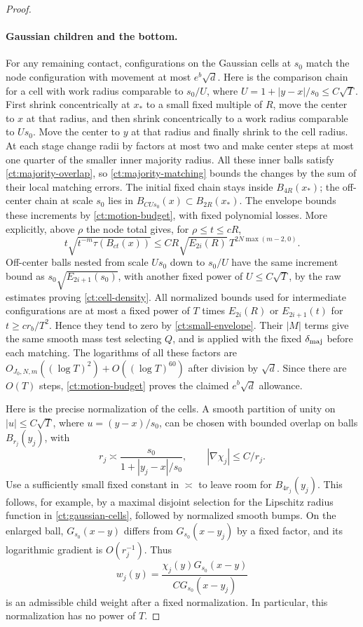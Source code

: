 \begin{proof}
\paragraph{Gaussian children and the bottom.}
For any remaining contact, configurations on the Gaussian cells at
$s_0$ match the node configuration with movement at most $e^b\sqrt d$.
Here is the comparison chain for a cell with work radius comparable to
$s_0/U$, where $U=1+|y-x|/s_0\le C\sqrt T$. First shrink concentrically
at $x_*$ to a small fixed multiple of $R$, move the center to $x$ at
that radius, and then shrink concentrically to a work radius comparable
to $Us_0$. Move the center to $y$ at that radius and finally shrink to
the cell radius. At each stage change radii by factors at most two and
make center steps at most one quarter of the smaller inner majority
radius. All these inner balls satisfy \eqref{ct:majority-overlap}, so
\eqref{ct:majority-matching} bounds the changes by the sum of their
local matching errors. The initial fixed chain stays inside
$B_{4R}(x_*)$; the off-center chain at scale $s_0$ lies in
$B_{CUs_0}(x)\subset B_{2R}(x_*)$. The envelope bounds these increments by
\eqref{ct:motion-budget}, with fixed polynomial losses.  More
explicitly, above $\rho$ the node total gives, for
$\rho\le t\le cR$,
\[
 t\sqrt{t^{-m}\tau(B_{ct}(x))}
 \le C R\sqrt{E_{2i}(R)}\,
              T^{2N\max(m-2,0)}.
\]
Off-center balls nested from scale $Us_0$ down to $s_0/U$ have the
same increment bound as $s_0\sqrt{E_{2i+1}(s_0)}$, with another
fixed power of $U\le C\sqrt T$, by the raw estimates proving
\eqref{ct:cell-density}. All normalized bounds used for intermediate
configurations are at most a fixed power of $T$ times $E_{2i}(R)$ or
$E_{2i+1}(t)$ for $t\ge cr_b/T^2$. Hence they tend to zero by
\eqref{ct:small-envelope}. Their $|M|$ terms give the same smooth mass
test selecting $Q$, and  is applied with the fixed
$\delta_{\rm maj}$ before each matching. The logarithms of all these factors are
$O_{J_0,N,m}((\log T)^2)+O((\log T)^{60})$ after division by
$\sqrt d$.  Since there are $O(T)$ steps,
\eqref{ct:motion-budget} proves the claimed $e^b\sqrt d$ allowance.

Here is the precise normalization of the cells.  A smooth partition of
unity on $|u|\le C\sqrt T$, where $u=(y-x)/s_0$, can be chosen with
bounded overlap on balls $B_{r_j}(y_j)$, with
\begin{equation}\label{ct:gaussian-cells}
 r_j\asymp\frac{s_0}{1+|y_j-x|/s_0},\qquad
 |\nabla\chi_j|\le C/r_j.
\end{equation}
Use a sufficiently small fixed constant in $\asymp$ to leave room for
$B_{4r_j}(y_j)$.  This follows, for example, by a maximal disjoint
selection for the Lipschitz radius function in
\eqref{ct:gaussian-cells}, followed by normalized smooth bumps.
On the enlarged ball, $G_{s_0}(x-y)$ differs from
$G_{s_0}(x-y_j)$ by a fixed factor, and its logarithmic gradient is
$O(r_j^{-1})$.  Thus
\[
 w_j(y)=\frac{\chi_j(y)G_{s_0}(x-y)}{C G_{s_0}(x-y_j)}
\]
is an admissible child weight after a fixed normalization.  In
particular, this normalization has no power of $T$.


\end{proof}
